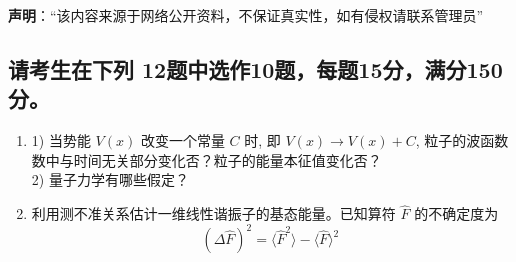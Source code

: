 
\textbf{声明}：“该内容来源于网络公开资料，不保证真实性，如有侵权请联系管理员”

\subsection{请考生在下列 12题中选作10题，每题15分，满分150分。}
\begin{enumerate}

    \item 1) 当势能 $V(x)$ 改变一个常量 $C$ 时, 即 $V(x) \rightarrow V(x) + C$, 粒子的波函数数中与时间无关部分变化否？粒子的能量本征值变化否？\\
   2) 量子力学有哪些假定？
    \item 利用测不准关系估计一维线性谐振子的基态能量。已知算符 $\hat{F}$ 的不确定度为
    \[
    (\Delta \hat{F})^2 = \langle \hat{F}^2 \rangle - \langle \hat{F} \rangle^2~
    \]
\end{enumerate}
